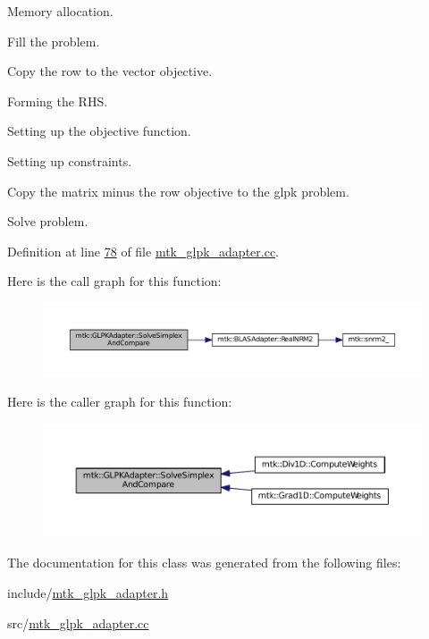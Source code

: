 \begin{DoxyEnumerate}
\item Memory allocation.
\item Fill the problem.
\item Copy the row to the vector objective.
\item Forming the R\-H\-S.
\item Setting up the objective function.
\item Setting up constraints.
\item Copy the matrix minus the row objective to the glpk problem.
\item Solve problem. 
\end{DoxyEnumerate}

Definition at line \hyperlink{mtk__glpk__adapter_8cc_source_l00078}{78} of file \hyperlink{mtk__glpk__adapter_8cc_source}{mtk\-\_\-glpk\-\_\-adapter.\-cc}.



Here is the call graph for this function\-:\nopagebreak
\begin{figure}[H]
\begin{center}
\leavevmode
\includegraphics[width=350pt]{classmtk_1_1GLPKAdapter_a834480aca83e3c0d09fdab7fdb7e8a3f_cgraph}
\end{center}
\end{figure}




Here is the caller graph for this function\-:\nopagebreak
\begin{figure}[H]
\begin{center}
\leavevmode
\includegraphics[width=350pt]{classmtk_1_1GLPKAdapter_a834480aca83e3c0d09fdab7fdb7e8a3f_icgraph}
\end{center}
\end{figure}




The documentation for this class was generated from the following files\-:\begin{DoxyCompactItemize}
\item 
include/\hyperlink{mtk__glpk__adapter_8h}{mtk\-\_\-glpk\-\_\-adapter.\-h}\item 
src/\hyperlink{mtk__glpk__adapter_8cc}{mtk\-\_\-glpk\-\_\-adapter.\-cc}\end{DoxyCompactItemize}
